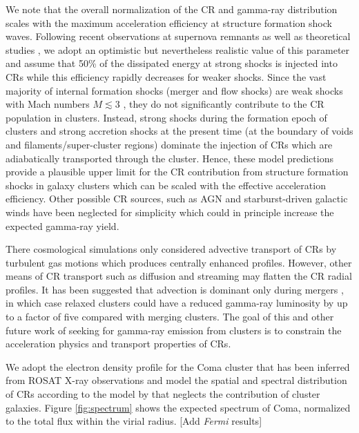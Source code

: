 \documentclass[12pt,manuscript]{aastex}
\begin{document}
We note that the overall normalization of the CR and gamma-ray distribution scales with the maximum acceleration efficiency at structure formation shock waves. Following recent observations at supernova remnants \citep{article:Helder_etal:2009} as well as theoretical studies \citep{article:KangJones:2005}, we adopt an optimistic but nevertheless realistic value of this parameter and assume that 50\% of the dissipated energy at strong shocks is injected into CRs while this efficiency rapidly decreases for weaker shocks. Since the vast majority of internal formation shocks (merger and flow shocks) are weak shocks with Mach numbers $M\lesssim3$ \citep[e.g.,][]{article:Ryu_etal:2003}, they do not significantly contribute to the CR population in clusters. Instead, strong shocks during the formation epoch of clusters and strong accretion shocks at the present time (at the boundary of voids and filaments/super-cluster regions) dominate the injection of CRs which are adiabatically transported through the cluster. Hence, these model predictions provide a plausible upper limit for the CR contribution from structure formation shocks in galaxy clusters which can be scaled with the effective acceleration efficiency. Other possible CR sources, such as AGN and starburst-driven galactic winds have been neglected for simplicity which could in principle increase the expected gamma-ray yield.

There cosmological simulations only considered advective transport of CRs by turbulent gas motions which produces centrally enhanced profiles.  However, other means of CR transport such as diffusion and streaming may flatten the CR radial profiles. It has been suggested that advection is dominant only during mergers \citep{article:EnsslinPfrommerMiniatiSubramanian:2011}, in which case relaxed clusters could have a reduced gamma-ray luminosity by up to a factor of five compared with merging clusters. The goal of this and other future work of seeking for gamma-ray emission from clusters is to constrain the acceleration physics and transport properties of CRs.

We adopt the electron density profile for the Coma cluster that has been inferred from ROSAT X-ray observations \citep{article:BrielHenryBohringer:1992} and model the spatial and spectral distribution of CRs according to the model by \citet{article:PinzkePfrommer:2010} that neglects the contribution of cluster galaxies. Figure \ref{fig:spectrum} shows the expected spectrum of Coma, normalized to the total flux within the virial radius. [Add {\em Fermi} results]
\end{document}
